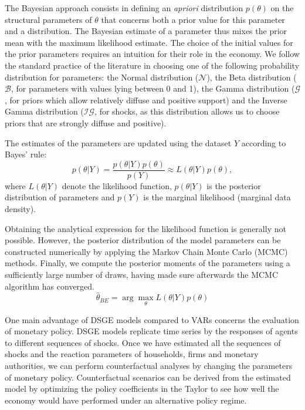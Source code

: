 \documentclass[a4paper,12pt]{article}%
\begin{document}
The Bayesian approach consists in defining an \textit{apriori} distribution
$p(\theta)$ on the structural parameters of $\theta$ that concerns both a
prior value for this parameter and a distribution. The Bayesian estimate of a
parameter thus mixes the prior mean with the maximum likelihood estimate. The
choice of the initial values for the prior parameters requires an intuition
for their role in the economy. We follow the standard practice of the
literature in choosing one of the following probability distribution for
parameters: the Normal distribution ($\mathcal{N}$), the Beta distribution
($\mathcal{B}$, for parameters with values lying between 0 and 1), the Gamma
distribution ($\mathcal{G}$, for priors which allow relatively diffuse and
positive support) and the Inverse Gamma distribution ($\mathcal{IG}$, for
shocks, as this distribution allows us to choose priors that are strongly
diffuse and positive).

The estimates of the parameters are updated using the dataset $Y$ according to
Bayes' rule:
\begin{equation}
p(\theta|Y)=\frac{p(\theta|Y)p(\theta)}{p(Y)}\approx L(\theta|Y)p(\theta),
\end{equation}
where $L(\theta|Y)$ denote the likelihood function, $p(\theta|Y)$ is the
posterior distribution of parameters and $p(Y)$ is the marginal likelihood
(marginal data density).

Obtaining the analytical expression for the likelihood function is generally
not possible. However, the posterior distribution of the model parameters can
be constructed numerically by applying the Markov Chain Monte Carlo (MCMC)
methods. Finally, we compute the posterior moments of the parameters using a
sufficiently large number of draws, having made sure afterwards the MCMC
algorithm has converged.%
\begin{equation}
\hat{\theta}_{BE}=\arg\max_{\theta}L(\theta|Y)p(\theta)
\end{equation}


One main advantage of DSGE models compared to VARs concerns the evaluation of
monetary policy. DSGE models replicate time series by the responses of agents
to different sequences of shocks. Once we have estimated all the sequences of
shocks and the reaction parameters of households, firms and monetary
authorities, we can perform counterfactual analyses by changing the parameters
of monetary policy. Counterfactual scenarios can be derived from the estimated
model by optimizing the policy coefficients in the Taylor to see how well the
economy would have performed under an alternative policy regime.
\end{document}
